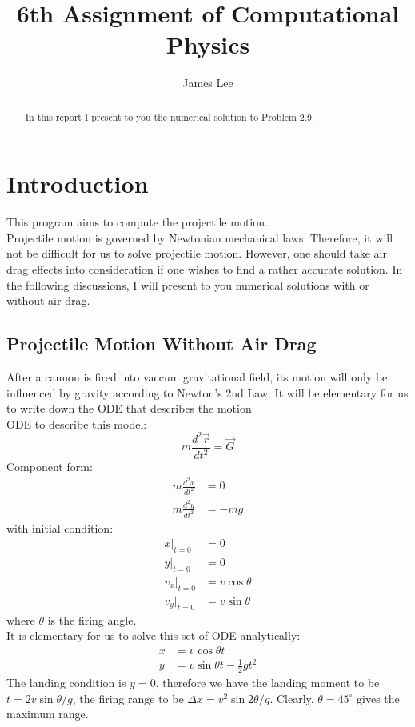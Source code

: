 \documentclass[10pt,a4paper]{article}
\author{James Lee}
\title{6th Assignment of Computational Physics}
\begin{document}
	\maketitle
	\begin{abstract}
		In this report I present to you the numerical solution to Problem 2.9.
	\end{abstract}
	\section{Introduction}
	This program aims to compute the projectile motion.\\
	Projectile motion is governed by Newtonian mechanical laws. Therefore, it will not be difficult for us to solve projectile motion. However, one should take air drag effects into consideration if one wishes to find a rather accurate solution. In the following discussions, I will present to you numerical solutions with or without air drag.
	\subsection{Projectile Motion Without Air Drag}
	After a cannon is fired into vaccum gravitational field, its motion will only be influenced by gravity according to Newton's 2nd Law. It will be elementary for us to write down the ODE that describes the motion\\
	ODE to describe this model:
	\begin{equation}
	m\frac{d^{2}\vec{r}}{dt^{2}}=\vec{G}
	\end{equation}
	Component form:
	\begin{align}
	m\frac{d^{2}x}{dt^{2}}&=0\\
	m\frac{d^{2}y}{dt^{2}}&=-mg
	\end{align}
	with initial condition:
	\begin{align}
	x|_{t=0}&=0\\
	y|_{t=0}&=0\\
	v_x|_{t=0}&=v\cos{\theta}\\
	v_y|_{t=0}&=v\sin{\theta}
	\end{align}
	where $\theta$ is the firing angle.\\
	It is elementary for us to solve this set of ODE analytically:
	\begin{align}
	x&=v\cos{\theta}t\\
	y&=v\sin{\theta}t-\frac{1}{2}gt^{2}
	\end{align}
	The landing condition is $y=0$, therefore we have the landing moment to be $t=2v\sin{\theta}/g$, the firing range to be $\Delta x=v^{2}\sin{2\theta}/g$. Clearly, $\theta=45^\circ$ gives the maximum range.
\end{document}
